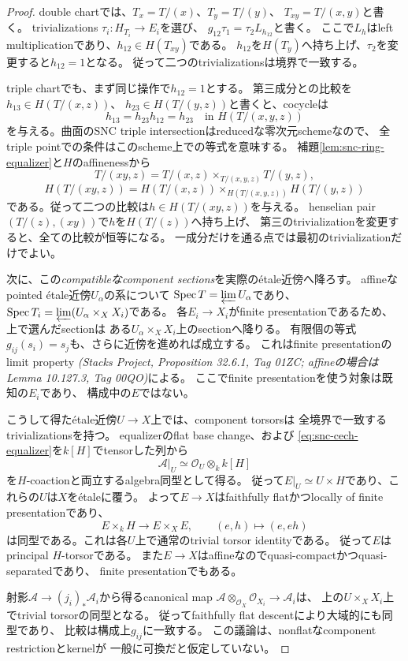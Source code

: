 \documentclass[uplatex,dvipdfmx,11pt]{jsarticle}
\numberwithin{equation}{section}
\theoremstyle{plain}
\theoremstyle{definition}
\theoremstyle{remark}
\DeclareMathOperator{\Spec}{Spec}
\newcommand{\OO}{\mathcal O}
\begin{document}
\begin{proof}
double chartでは、$T_x=T/(x)$、$T_y=T/(y)$、
$T_{xy}=T/(x,y)$と書く。
trivializations $\tau_i:H_{T_i}\to E_i$を選び、
$g_{12}\tau_1=\tau_2L_{h_{12}}$と書く。
ここで$L_h$はleft multiplicationであり、$h_{12}\in H(T_{xy})$である。
$h_{12}$を$H(T_y)$へ持ち上げ、$\tau_2$を変更すると$h_{12}=1$となる。
従って二つのtrivializationsは境界で一致する。

triple chartでも、まず同じ操作で$h_{12}=1$とする。
第三成分との比較を$h_{13}\in H(T/(x,z))$、
$h_{23}\in H(T/(y,z))$と書くと、cocycleは
\[
h_{13}=h_{23}h_{12}=h_{23}\quad\text{in }H(T/(x,y,z))
\]
を与える。曲面のSNC triple intersectionはreducedな零次元schemeなので、
全triple pointでの条件はこのscheme上での等式を意味する。
補題\ref{lem:snc-ring-equalizer}と$H$のaffinenessから
\[
T/(xy,z)=T/(x,z)\times_{T/(x,y,z)}T/(y,z),
\]
\[
H(T/(xy,z))=
H(T/(x,z))\times_{H(T/(x,y,z))}H(T/(y,z))
\]
である。従って二つの比較は$h\in H(T/(xy,z))$を与える。
henselian pair $(T/(z),(xy))$で$h$を$H(T/(z))$へ持ち上げ、
第三のtrivializationを変更すると、全ての比較が恒等になる。
一成分だけを通る点では最初のtrivializationだけでよい。

次に、この\emph{compatibleなcomponent sections}を実際のétale近傍へ降ろす。
affineなpointed étale近傍$U_\alpha$の系について
$\Spec T=\varprojlim U_\alpha$であり、
$\Spec T_i=\varprojlim(U_\alpha\times_X X_i)$である。
各$E_i\to X_i$がfinite presentationであるため、上で選んだsectionは
ある$U_\alpha\times_X X_i$上のsectionへ降りる。
有限個の等式$g_{ij}(s_i)=s_j$も、さらに近傍を進めれば成立する。
これはfinite presentationのlimit property
\emph{(Stacks Project, Proposition 32.6.1, Tag 01ZC;
affineの場合はLemma 10.127.3, Tag 00QO)}による。
ここでfinite presentationを使う対象は既知の$E_i$であり、
構成中の$E$ではない。

こうして得たétale近傍$U\to X$上では、component torsorsは
全境界で一致するtrivializationsを持つ。
equalizerのflat base change、および
\eqref{eq:snc-cech-equalizer}を$k[H]$でtensorした列から
\[
\mathcal A|_U\simeq\OO_U\otimes_k k[H]
\]
を$H$-coactionと両立するalgebra同型として得る。
従って$E|_U\simeq U\times H$であり、これらの$U$は$X$をétaleに覆う。
よって$E\to X$はfaithfully flatかつlocally of finite presentationであり、
\[
E\times_k H\longrightarrow E\times_X E,
\qquad(e,h)\longmapsto(e,eh)
\]
は同型である。これは各$U$上で通常のtrivial torsor identityである。
従って$E$はprincipal $H$-torsorである。
また$E\to X$はaffineなのでquasi-compactかつquasi-separatedであり、
finite presentationでもある。

射影$\mathcal A\to(j_i)_*\mathcal A_i$から得るcanonical map
$\mathcal A\otimes_{\OO_X}\OO_{X_i}\to\mathcal A_i$は、
上の$U\times_X X_i$上でtrivial torsorの同型となる。
従ってfaithfully flat descentにより大域的にも同型であり、
比較は構成上$g_{ij}$に一致する。
この議論は、nonflatなcomponent restrictionとkernelが
一般に可換だと仮定していない。


\end{proof}
\end{document}
